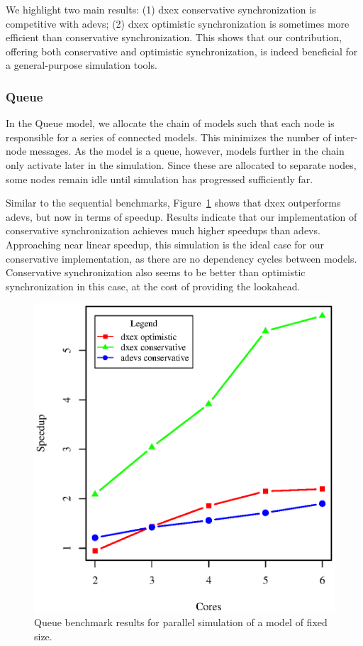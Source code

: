 We highlight two main results:
(1) dxex conservative synchronization is competitive with adevs;
(2) dxex optimistic synchronization is sometimes more efficient than conservative synchronization.
This shows that our contribution, offering both conservative and optimistic synchronization, is indeed beneficial for a general-purpose simulation tools.

\subsubsection{Queue}
In the Queue model, we allocate the chain of models such that each node is responsible for a series of connected models.
This minimizes the number of inter-node messages.
As the model is a queue, however, models further in the chain only activate later in the simulation.
Since these are allocated to separate nodes, some nodes remain idle until simulation has progressed sufficiently far.

Similar to the sequential benchmarks, Figure~\ref{fig:queue_benchmark_parallel} shows that dxex outperforms adevs, but now in terms of speedup.
Results indicate that our implementation of conservative synchronization achieves much higher speedups than adevs.
Approaching near linear speedup, this simulation is the ideal case for our conservative implementation, as there are no dependency cycles between models.
Conservative synchronization also seems to be better than optimistic synchronization in this case, at the cost of providing the lookahead.

\begin{figure}
    \center
	\includegraphics[width=\plotfraction\columnwidth]{fig/queue_parallel.eps}
	\caption{Queue benchmark results for parallel simulation of a model of fixed size.}
	\label{fig:queue_benchmark_parallel}
\end{figure}

